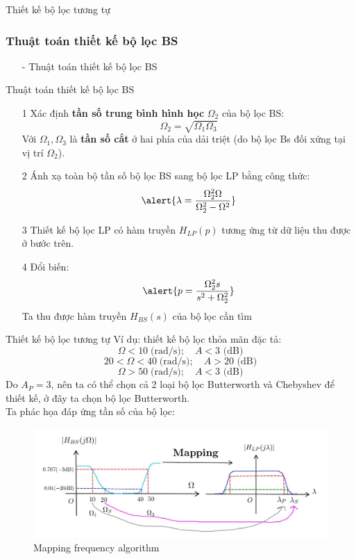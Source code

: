 \documentclass[8pt]{beamer}
\begin{document}
\begin{frame}{Thiết kế bộ lọc tương tự}
\subsubsection{Thuật toán thiết kế bộ lọc BS}
\begin{itemize}
	\item[-] Thuật toán thiết kế bộ lọc BS
\end{itemize}
\begin{block}{Thuật toán thiết kế bộ lọc BS}
\begin{enumerate}
	\item[1] Xác định \textbf{tần số trung bình hình học} $\Omega_{2}$ của bộ lọc BS: $$\Omega_{2}=\sqrt{\Omega_{1}\Omega_{3}}$$
	Với $\Omega_{1},\Omega_{3}$ là \textbf{tần số cắt} ở hai phía của dải triệt (do bộ lọc Bs đối xứng tại vị trí $\Omega_{2}$).
\item[2] Ánh xạ toàn bộ tần số bộ lọc BS sang bộ lọc LP bằng công thức: $$\alert{\lambda=\frac{\Omega_{2}^2\Omega}{\Omega_{2}^2-\Omega^2}}$$
\item[3] Thiết kế bộ lọc LP có hàm truyền $H_{LP}(p)$ tương ứng từ dữ liệu thu được ở bước trên.
\item[4] Đổi biến: $$\alert{p=\frac{\Omega_{2}^2s}{s^2+\Omega_{2}^2}}$$ 
	Ta thu được hàm truyền $H_{BS}(s)$ của bộ lọc cần tìm
\end{enumerate}
\end{block}
\end{frame}
\begin{frame}{Thiết kế bộ lọc tương tự}
 Ví dụ: thiết kế bộ lọc thỏa mãn đặc tả:
$$\Omega<10\;\text{(rad/s)};\quad A<3\text{ (dB)}$$
$$20<\Omega<40\;\text{(rad/s)};\quad A>20\text{ (dB)}$$
$$\Omega>50\;\text{(rad/s)};\quad A<3\text{ (dB)}$$
Do $A_{P}=3$, nên ta có thể chọn cả 2 loại bộ lọc Butterworth và Chebyshev để thiết kế, ở đây ta chọn bộ lọc Butterworth.
\\ Ta phác họa đáp ứng tần số của bộ lọc:
\begin{figure}[h]
	\includegraphics[width=1\textwidth]{22.jpg}
	\caption{Mapping frequency algorithm}			\label{fig:re2}
		\end{figure}


\end{frame}
\end{document}
